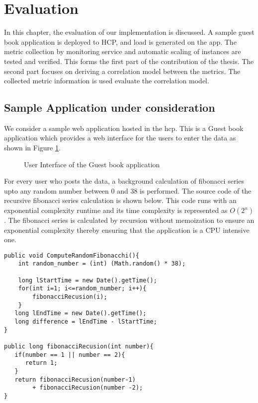 \documentclass[article,type=msc,colorback,12pt,accentcolor=tud8b,table]{tudthesis}
\begin{document}
 \cleardoublepage
 
  \hfill 
 \section{Evaluation}
 \hfill \break
 
 In this chapter, the evaluation of our implementation is discussed. A sample guest book application is deployed to HCP, and load is generated on the app. The metric collection by monitoring service and automatic scaling of instances are tested and verified. This forms the first part of the contribution of the thesis. The second part focuses on deriving a correlation model between the metrics. The collected metric information is used evaluate the correlation model. 

	\subsection{Sample Application under consideration}
We consider a sample web application hosted in the \gls{hcp}. This is a Guest book application which provides a web interface for the users to enter the data as shown in Figure \ref{fig:guestbook_ui}. 
 \begin{figure}[h]
 \begin{center}
  \makebox[\textwidth]{\texttt{[image: E1]}}
\end{center}
\caption{User Interface of the Guest book application}
\label{fig:guestbook_ui}
\end{figure}
For every user who posts the data, a background calculation of fibonacci series upto any random number between 0 and 38 is performed. The source code of the recursive fibonacci series calculation is shown below. This code runs with an exponential complexity runtime and its time complexity is represented as $O(2^n)$. The fibonacci series is calculated by recursion without memoization to ensure an exponential complexity thereby ensuring that the application is a CPU intensive one.
 \begin{lstlisting}
public void ComputeRandomFibonacchi(){		
	int random_number = (int) (Math.random() * 38);		
		
	long lStartTime = new Date().getTime();
	for(int i=1; i<=random_number; i++){
		fibonacciRecusion(i);
    }			
   long lEndTime = new Date().getTime();
   long difference = lEndTime - lStartTime;    	
}
		  
public long fibonacciRecusion(int number){
   if(number == 1 || number == 2){
      return 1;
   }
   return fibonacciRecusion(number-1) 
   		+ fibonacciRecusion(number -2); 
}
\end{lstlisting}
\end{document}
